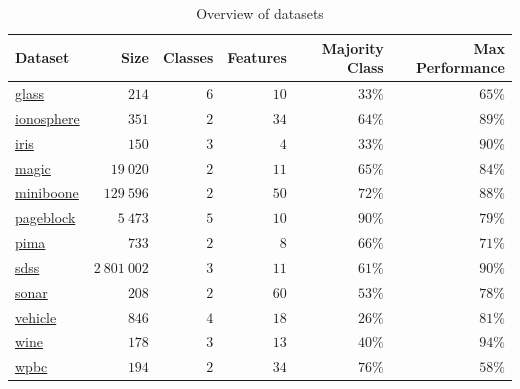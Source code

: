 \documentclass[fleqn,10pt,lineno]{wlpeerj} %
\begin{document}
\begin{table}[htbp]
	\caption {Overview of datasets} \label{tab:datasets}
	\centering
	\begin{tabular}{lrrrrr}
		\toprule
		{Dataset}  & Size &  Classes & Features & Majority Class & Max Performance \\
		\midrule
        \href{https://archive.ics.uci.edu/ml/datasets/Glass+Identification}{glass}
        	& $214$ & $6$ & $10$ & $33\%$ & $65\%$ \\
		\href{https://archive.ics.uci.edu/ml/datasets/Ionosphere}{ionosphere}
			& $351$ & $2$ & $34$ & $64\%$ & $89\%$ \\
		\href{https://archive.ics.uci.edu/ml/datasets/Iris}{iris}
        	& $150$ & $3$ & $4$ & $33\%$ & $90\%$ \\
        \href{https://archive.ics.uci.edu/ml/datasets/MAGIC+Gamma+Telescope}{magic}
        	& $19~020$ & $2$ & $11$ & $65\%$ & $84\%$ \\
        \href{https://archive.ics.uci.edu/ml/datasets/MiniBooNE+particle+identification}{miniboone}
        	& $129~596$ & $2$ & $50$ & $72\%$ & $88\%$ \\
        \href{https://archive.ics.uci.edu/ml/datasets/Page+Blocks+Classification}{pageblock}
        	& $5~473$ & $5$ & $10$ & $90\%$ & $79\%$ \\
		\href{https://archive.ics.uci.edu/ml/datasets/Pima+Indians+Diabetes}{pima}
        	& $733$ & $2$ & $8$ & $66\%$ & $71\%$ \\
        \href{https://doi.org/10.5281/zenodo.58500}{sdss}
        	& $2~801~002$ & $3$ & $11$ & $61\%$ & $90\%$ \\
		\href{https://archive.ics.uci.edu/ml/datasets/Connectionist+Bench+(Sonar,+Mines+vs.+Rocks)}{sonar}
        	& $208$ & $2$ & $60$ & $53\%$ & $78\%$ \\
        \href{https://archive.ics.uci.edu/ml/datasets/Statlog+(Vehicle+Silhouettes)}{vehicle}
			& $846$ & $4$ & $18$ & $26\%$ & $81\%$ \\
		\href{https://archive.ics.uci.edu/ml/datasets/Wine}{wine}
        	& $178$ & $3$ & $13$ & $40\%$ & $94\%$ \\
		\href{https://archive.ics.uci.edu/ml/datasets/Breast+Cancer+Wisconsin+(Prognostic)}{wpbc}
        	& $194$ & $2$ & $34$ & $76\%$ & $58\%$ \\
		\bottomrule
	\end{tabular}
\end{table}
\end{document}
